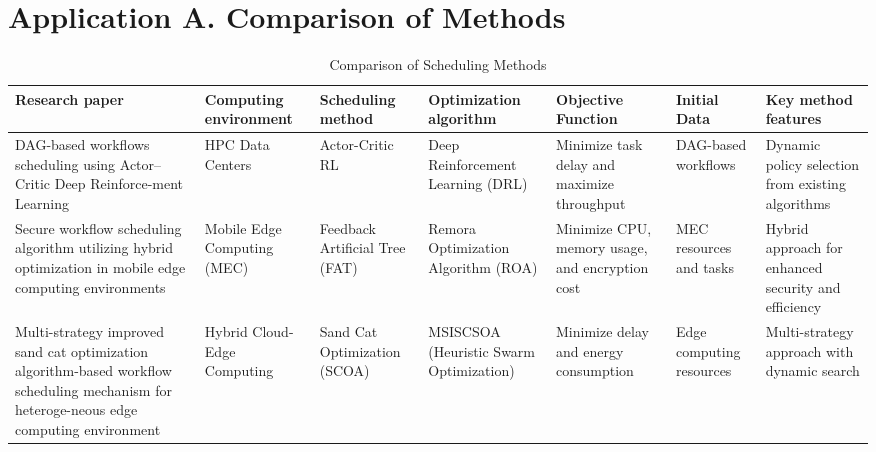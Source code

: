 \documentclass[a4paper, final]{article}
\begin{document}
\section* {Application A. Comparison of Methods}
\hypertarget{ApplA}{}
\begin{table}[H]
    \centering
    \caption{Comparison of Scheduling Methods}
    \label{tbl:1}
    \scriptsize
    \begin{tabularx}{\textwidth}{|p{3.5cm}|X|X|p{2cm}|X|X|X|}
    \hline
    \textbf{Research paper} & \textbf{Computing environment} & \textbf{Scheduling method} & 
    \textbf{Optimization algorithm} & \textbf{Objective Function} & \textbf{Initial Data} & 
    \textbf{Key method features} \\
    \hline

    DAG-based workflows scheduling using Actor–Critic Deep Reinforce-ment Learning \cite{bib:1_acrl} &
    HPC Data Centers &
    Actor-Critic RL &
    Deep Reinforcement Learning (DRL) &
    Minimize task delay and maximize throughput &
    DAG-based workflows &
    Dynamic policy selection from existing algorithms \\
    \hline

    Secure workflow scheduling algorithm utilizing hybrid optimization in mobile edge computing environments \cite{bib:2_faro} &
    Mobile Edge Computing (MEC) &
    Feedback Artificial Tree (FAT) &
    Remora Optimization Algorithm (ROA) &
    Minimize CPU, memory usage, and encryption cost &
    MEC resources and tasks &
    Hybrid approach for enhanced security and efficiency \\
    \hline

    Multi-strategy improved sand cat optimization algorithm-based workflow scheduling mechanism for heteroge-neous edge computing environment \cite{bib:3_sandcat} &
    Hybrid Cloud-Edge Computing &
    Sand Cat Optimization (SCOA) &
    MSISCSOA (Heuristic Swarm Optimization) &
    Minimize delay and energy consumption &
    Edge computing resources &
    Multi-strategy approach with dynamic search \\
    \hline


\end{tabularx}
\end{table}
\end{document}
